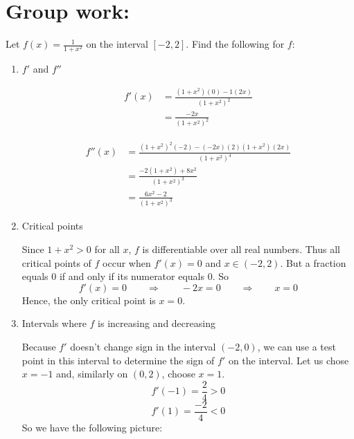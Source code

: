 \documentclass[handout,nooutcomes]{ximera}
\begin{document}
	
	
	
	
	

\section*{Group work:}



\begin{problem}
Let $f(x) = \frac{1}{1 + x^2}$ on the interval $[-2,2]$.  Find the following for $f$:

	\begin{enumerate}
	
	\item  $f'$ and $f''$
	
		\begin{freeResponse}
			\begin{align*}
			f'(x) &= \frac{(1+x^2)(0) - 1(2x)}{(1+x^2)^2} \\
			&= \frac{-2x}{(1+x^2)^2}
			\end{align*}
			
			\begin{align*}
			f''(x) &= \frac{(1+x^2)^2(-2) - (-2x)(2)(1+x^2)(2x)}{(1+x^2)^4} \\
			&= \frac{-2(1+x^2) + 8x^2}{(1+x^2)^3} \\
			&= \frac{6x^2 - 2}{(1+x^2)^3}
			\end{align*}
		\end{freeResponse}
		
	\item  Critical points
	
		\begin{freeResponse}
		Since $1+x^2 > 0$ for all $x$, $f$ is differentiable over all real numbers.  Thus all critical points of $f$ occur when $f'(x) = 0$ and $x \in (-2,2)$.  But a fraction equals 0 if and only if its numerator equals 0.  So
		$$ f'(x) = 0 \qquad \Longrightarrow \qquad -2x = 0 \qquad \Longrightarrow \qquad x=0 $$
		Hence, the only critical point is $x=0$.  
		\end{freeResponse}
		
	\item  Intervals where $f$ is increasing and decreasing
	
		\begin{freeResponse}
		Because $f'$ doesn’t change sign in the interval $(-2,0)$, we can use a test point in this interval to determine the sign of $f'$ on the interval.  Let us chose $x=-1$ and, similarly on $(0,2)$, choose $x=1$.
		$$ f'(-1) = \frac{2}{4} > 0 $$
		$$ f'(1) = \frac{-2}{4} < 0 $$
		So we have the following picture:
		

\end{freeResponse}
\end{enumerate}
\end{problem}
\end{document}
